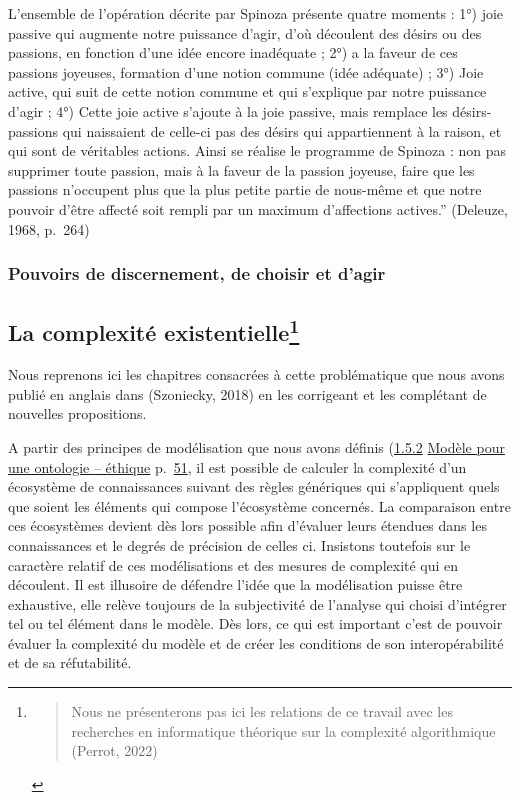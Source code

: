 \documentclass[
  a4paper,
  DIV=11,
  numbers=noendperiod]{scrreprt}
\begin{document}
L'ensemble de l'opération décrite par Spinoza présente quatre moments :
1°) joie passive qui augmente notre puissance d'agir, d'où découlent des
désirs ou des passions, en fonction d'une idée encore inadéquate ; 2°) a
la faveur de ces passions joyeuses, formation d'une notion commune (idée
adéquate) ; 3°) Joie active, qui suit de cette notion commune et qui
s'explique par notre puissance d'agir ; 4°) Cette joie active s'ajoute à
la joie passive, mais remplace les désirs-passions qui naissaient de
celle-ci pas des désirs qui appartiennent à la raison, et qui sont de
véritables actions. Ainsi se réalise le programme de Spinoza : non pas
supprimer toute passion, mais à la faveur de la passion joyeuse, faire
que les passions n'occupent plus que la plus petite partie de nous-même
et que notre pouvoir d'être affecté soit rempli par un maximum
d'affections actives.'' (Deleuze, 1968, p.~264)

\subsubsection{Pouvoirs de discernement, de choisir et
d'agir}\label{pouvoirs-de-discernement-de-choisir-et-dagir}

\subsection[La complexité existentielle]{\texorpdfstring{La complexité
existentielle\footnote{\begin{quote}
  Nous ne présenterons pas ici les relations de ce travail avec les
  recherches en informatique théorique sur la complexité algorithmique
  (Perrot, 2022)
  \end{quote}}}{La complexité existentielle}}\label{sec-complexiteExitentielle}

Nous reprenons ici les chapitres consacrées à cette problématique que
nous avons publié en anglais dans (Szoniecky, 2018) en les corrigeant et
les complétant de nouvelles propositions.

A partir des principes de modélisation que nous avons définis
(\hyperref[anchor-18]{1.5.2} \hyperref[anchor-18]{Modèle pour une
ontologie -- éthique} p.~\hyperref[anchor-18]{51}, il est possible de
calculer la complexité d'un écosystème de connaissances suivant des
règles génériques qui s'appliquent quels que soient les éléments qui
compose l'écosystème concernés. La comparaison entre ces écosystèmes
devient dès lors possible afin d'évaluer leurs étendues dans les
connaissances et le degrés de précision de celles ci. Insistons
toutefois sur le caractère relatif de ces modélisations et des mesures
de complexité qui en découlent. Il est illusoire de défendre l'idée que
la modélisation puisse être exhaustive, elle relève toujours de la
subjectivité de l'analyse qui choisi d'intégrer tel ou tel élément dans
le modèle. Dès lors, ce qui est important c'est de pouvoir évaluer la
complexité du modèle et de créer les conditions de son interopérabilité
et de sa réfutabilité.
\end{document}
